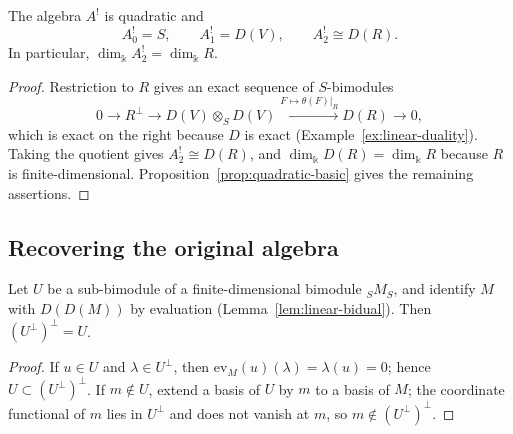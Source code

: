 \begin{proposition}\label{prop:dual-low-degrees}
The algebra $A^!$ is quadratic and
\[
A^!_0=S,\qquad A^!_1=D(V),\qquad A^!_2\cong D(R).
\]
In particular, $\dim_\Bbbk A^!_2=\dim_\Bbbk R$.
\end{proposition}

\begin{proof}
Restriction to $R$ gives an exact sequence of $S$-bimodules
\begin{equation}\label{eq:restriction-relations}
0\longrightarrow R^\perp\longrightarrow D(V)\otimes_S D(V)
\xrightarrow{F\mapsto\theta(F)|_R}D(R)\longrightarrow0,
\end{equation}
which is exact on the right because $D$ is exact (Example~\ref{ex:linear-duality}).
Taking the quotient gives $A^!_2\cong D(R)$, and $\dim_\Bbbk D(R)=\dim_\Bbbk R$ because $R$ is finite-dimensional.
Proposition~\ref{prop:quadratic-basic} gives the remaining assertions.
\end{proof}
%

\subsection{Recovering the original algebra}


\begin{lemma}\label{lem:double-orthogonal}
Let $U$ be a sub-bimodule of a finite-dimensional bimodule ${}_SM_S$, and identify $M$ with $D(D(M))$ by evaluation (Lemma~\ref{lem:linear-bidual}).
Then $(U^\perp)^\perp=U$.
\end{lemma}

\begin{supplementary}
\begin{proof}
If $u\in U$ and $\lambda\in U^\perp$, then $\mathrm{ev}_M(u)(\lambda)=\lambda(u)=0$; hence $U\subset(U^\perp)^\perp$.
If $m\notin U$, extend a basis of $U$ by $m$ to a basis of $M$; the coordinate functional of $m$ lies in $U^\perp$ and does not vanish at $m$, so $m\notin(U^\perp)^\perp$.
\end{proof}
\end{supplementary}

